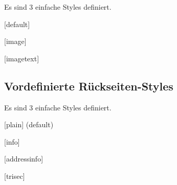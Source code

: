 Es sind 3 einfache Styles definiert.%

\begin{center}
  \begin{minipage}[t]{0.33\textwidth}
    \centering\sffamily
    [default]
  \end{minipage}%
  \begin{minipage}[t]{0.33\textwidth}
    \centering\sffamily
    [image]
  \end{minipage}%
  \begin{minipage}[t]{0.33\textwidth}
    \centering\sffamily
    [imagetext]
  \end{minipage}
\end{center}

\subsection{Vordefinierte Rückseiten-Styles}\label{sec:backstyles}

Es sind 3 einfache Styles definiert.%

\begin{center}
  \begin{minipage}[t]{0.33\textwidth}
    \centering\sffamily
    [plain] (default)
  \end{minipage}%
  \begin{minipage}[t]{0.33\textwidth}
    \centering\sffamily
    [info]
  \end{minipage}%
  \begin{minipage}[t]{0.33\textwidth}
    \centering\sffamily
    [addressinfo]
  \end{minipage}
  \begin{minipage}[t]{0.33\textwidth}
    \centering\sffamily
    [trisec]
  \end{minipage}
\end{center}

